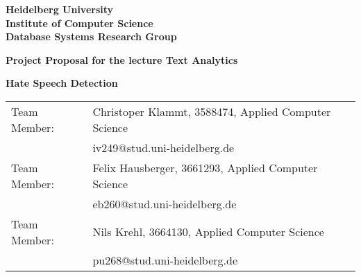 \documentclass[
     12pt,         %
     a4paper,      %
     BCOR10mm,     %
     DIV14,        %
     ]{article}
\begin{document}
\begin{titlepage}

\vspace*{1cm}
\begin{center}
\vspace*{3cm}
\textbf{ 
\Large Heidelberg University\\
\smallskip
\Large Institute of Computer Science\\
\smallskip
\Large Database Systems Research Group\\
\smallskip
}

\vspace{3cm}

\textbf{\large Project Proposal for the lecture Text Analytics}

\vspace{0.5\baselineskip}
{\huge
\textbf{Hate Speech Detection}
}
\end{center}

\vfill 

{\large
\begin{tabular}[l]{ll}
Team Member: & Christoper Klammt, 3588474, Applied Computer Science\\
  & iv249@stud.uni-heidelberg.de\\
Team Member: & Felix Hausberger, 3661293, Applied Computer Science\\
  & eb260@stud.uni-heidelberg.de\\
Team Member: & Nils Krehl, 3664130, Applied Computer Science\\
  & pu268@stud.uni-heidelberg.de\\
  
\end{tabular}
}

\end{titlepage}









\printbibliography
\end{document}
